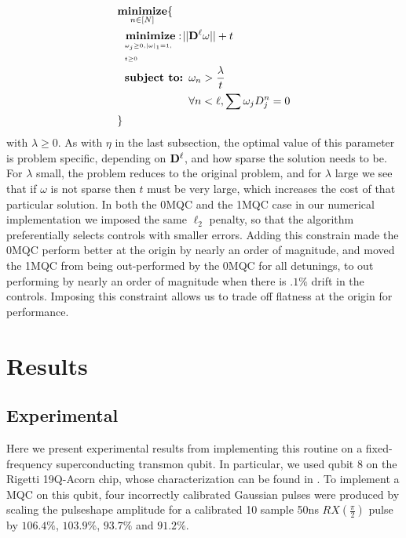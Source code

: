 \documentclass[aps,nofootinbib,pra,notitlepage,twocolumn]{revtex4-1}
\begin{document}
\begin{equation}\label{eq:minimization_regularization}
\begin{split}
&\underset{n\in[N]}{\textbf{minimize}}\{\\
&\ \ \bunderbrace{\textbf{minimize}: }{\omega_j\geq0, |\omega|_1=1,\\ t\geq0} ||{\bold{D}^{\ell}}\omega|| + t\\
&\ \ \textbf{subject to: } \omega_n > \frac{\lambda}{t}\\
&\ \ \phantom{\textbf{subject to: }} \forall n<\ell, \sum \omega_jD_j^n=0\\
&\}
\end{split}
\end{equation} with $\lambda\geq0$. As with $\eta$ in the last subsection, the optimal value of this parameter is problem specific, depending on $\bold{D}^\ell$, and how sparse the solution needs to be. For $\lambda$ small, the problem reduces to the original problem, and for $\lambda$ large we see that if $\omega$ is not sparse then $t$ must be very large, which increases the cost of that particular solution.
In both the 0MQC and the 1MQC case in our numerical implementation we imposed the same $\ell_2$ penalty, so that the algorithm preferentially selects controls with smaller errors. Adding this constrain made the 0MQC perform better at the origin by nearly an order of magnitude, and moved the 1MQC from being out-performed by the 0MQC for all detunings, to out performing by nearly an order of magnitude when there is $.1\%$ drift in the controls. Imposing this constraint allows us to trade off flatness at the origin for performance.

\section{Results} %
\label{sec:results}


\subsection{Experimental} %
\label{sub:experimental}
Here we present experimental results from implementing this routine on a fixed-frequency superconducting transmon qubit. In particular, we used qubit 8 on the Rigetti 19Q-Acorn chip, whose characterization can be found in \cite{1712.05771}. To implement a MQC on this qubit, four incorrectly calibrated Gaussian pulses were produced by scaling the pulseshape amplitude for a calibrated 10 sample 50ns $RX(\frac{\pi}{2})$ pulse by $106.4\%$,  $103.9\%$, $93.7\%$ and $91.2\%$.
\end{document}
